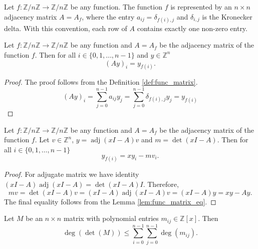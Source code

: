 \begin{definition}
\label{def:func_matrix}
\leanok
Let $f: \mathbb{Z}/n\mathbb{Z} \to \mathbb{Z}/n\mathbb{Z}$ be any function. The function $f$ is represented by an 
$n \times n$ adjacency matrix $A=A_f$, where the entry 
$a_{ij} = \delta_{f(i),j}$ 
and $\delta_{i,j}$ is the Kronecker delta.
With this convention, each row of $A$ contains exactly one non-zero entry.
\end{definition}

\begin{lemma}
\label{lem:func_matrix_eq}
\leanok
Let $f: \mathbb{Z}/n\mathbb{Z} \to \mathbb{Z}/n\mathbb{Z}$ be any function and $A=A_f$ be the adjacency matrix of the function $f$. 
Then for all $i\in \{0,1,\ldots,n-1\}$ and $y\in \mathbb{Z}^n$
$$(A y)_i = y_{f(i)}.$$
\end{lemma}

\begin{proof}
The proof follows from the Definition \ref{def:func_matrix}.
$$(A y)_i = \sum_{j=0}^{n-1} a_{ij} y_j = \sum_{j=0}^{n-1} \delta_{f(i),j} y_j = y_{f(i)}$$
\end{proof}

\begin{lemma}
\label{lem:adj_eq}
\leanok
Let $f: \mathbb{Z}/n\mathbb{Z} \to \mathbb{Z}/n\mathbb{Z}$ be any function and $A=A_f$ be the adjacency matrix of the function $f$. 
Let $v\in \mathbb{Z}^n$, $y = \operatorname{adj}(x I - A) v$ and $m = \det(x I - A)$. Then for all $i\in \{0,1,\ldots,n-1\}$
$$y_{f(i)} = x y_i - m v_i.$$
\end{lemma}

\begin{proof}
For adjugate matrix we have identity 
$(x I - A) \operatorname{adj} (x I - A) = \det(x I - A) I$.
Therefore,
$$m v = \det(x I - A) v = (x I - A) \operatorname{adj} (x I - A) v 
= (x I - A) y = x y - A y.$$
The final equality follows from the Lemma \ref{lem:func_matrix_eq}.
\end{proof}

\begin{lemma}
\label{lem:det_degree_le_sum_degrees}
\leanok
Let $M$ be an $n \times n$ matrix with polynomial entries $m_{ij} \in \mathbb{Z}[x]$.
Then 
$$\deg(\det(M)) \leq \sum_{i=0}^{n-1} \sum_{j=0}^{n-1} \deg(m_{ij}).$$
\end{lemma}

